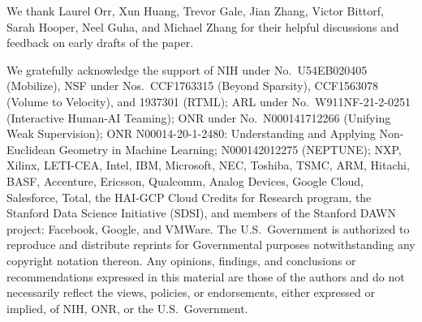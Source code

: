 \documentclass[nohyperref]{article}
\begin{document}
We thank Laurel Orr, Xun Huang, Trevor Gale, Jian Zhang, Victor Bittorf, Sarah Hooper, Neel Guha, and Michael Zhang for their helpful discussions and feedback on early drafts of the paper.

We gratefully acknowledge the support of NIH under No.\ U54EB020405 (Mobilize), NSF under Nos.\ CCF1763315 (Beyond Sparsity), CCF1563078 (Volume to Velocity), and 1937301 (RTML); ARL under No.\ W911NF-21-2-0251 (Interactive Human-AI Teaming); ONR under No.\ N000141712266 (Unifying Weak Supervision); ONR N00014-20-1-2480: Understanding and Applying Non-Euclidean Geometry in Machine Learning; N000142012275 (NEPTUNE); NXP, Xilinx, LETI-CEA, Intel, IBM, Microsoft, NEC, Toshiba, TSMC, ARM, Hitachi, BASF, Accenture, Ericsson, Qualcomm, Analog Devices, Google Cloud, Salesforce, Total, the HAI-GCP Cloud Credits for Research program,  the Stanford Data Science Initiative (SDSI), and members of the Stanford DAWN project: Facebook, Google, and VMWare. The U.S.\ Government is authorized to reproduce and distribute reprints for Governmental purposes notwithstanding any copyright notation thereon. Any opinions, findings, and conclusions or recommendations expressed in this material are those of the authors and do not necessarily reflect the views, policies, or endorsements, either expressed or implied, of NIH, ONR, or the U.S.\ Government.





\newpage
\appendix
\onecolumn









\end{document}
